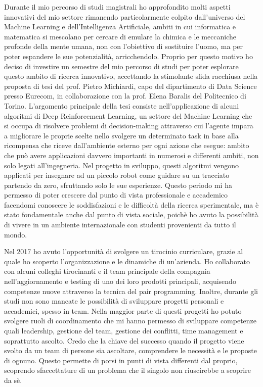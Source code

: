 \documentclass[11pt, a4paper]{awesome-cv}
\begin{document}
\begin{cvletter}
Durante il mio percorso di studi magistrali ho approfondito molti aspetti innovativi del mio settore rimanendo particolarmente colpito dall'universo del Machine Learning e dell'Intelligenza Artificiale, ambiti in cui informatica e matematica si mescolano per cercare di emulare la chimica e le meccaniche profonde della mente umana, non con l'obiettivo di sostituire l'uomo, ma per poter espandere le sue potenzialità, arricchendolo.
Proprio per questo motivo ho deciso di investire un semestre del mio percorso di studi per poter esplorare questo ambito di ricerca innovativo, accettando la stimolante sfida racchiusa nella proposta di tesi del prof. Pietro Michiardi, capo del dipartimento di Data Science presso Eurecom, in collaborazione con la prof. Elena Baralis del Politecnico di Torino.
L'argomento principale della tesi consiste nell'applicazione di alcuni algoritmi di Deep Reinforcement Learning, un settore del Machine Learning che si occupa di risolvere problemi di decision-making attraverso cui l'agente impara a migliorare le proprie scelte nello svolgere un determinato task in base alla ricompensa che riceve dall'ambiente esterno per ogni azione che esegue: ambito che può avere applicazioni davvero importanti in numerosi e differenti ambiti, non solo legati all'ingegneria. Nel progetto in sviluppo, questi algoritmi vengono applicati per insegnare ad un piccolo robot come guidare su un tracciato partendo da zero, sfruttando solo le sue esperienze.
Questo periodo mi ha permesso di poter crescere dal punto di vista professionale e accademico facendomi conoscere le soddisfazioni e le difficoltà della ricerca sperimentale, ma è stato fondamentale anche dal punto di vista sociale, poichè ho avuto la possibilità di vivere in un ambiente internazionale con studenti provenienti da tutto il mondo.

Nel 2017 ho avuto l'opportunità di svolgere un tirocinio curriculare, grazie al quale ho scoperto l'organizzazione e le dinamiche di un'azienda. Ho collaborato con alcuni colleghi tirocinanti e il team principale della compagnia nell'aggiornamento e testing di uno dei loro prodotti principali, acquisendo competenze nuove attraverso la tecnica del pair programming.
Inoltre, durante gli  studi non sono mancate le possibilità di sviluppare progetti personali e accademici, spesso in team. Nella maggior parte di questi progetti ho potuto svolgere ruoli di coordinamento che mi hanno permesso di sviluppare competenze quali leadership, gestione del team, gestione dei conflitti, time management e soprattutto ascolto. Credo che la chiave del successo quando il progetto viene svolto da un team di persone sia ascoltare, comprendere le necessità e le proposte di ognuno. Questo permette di porsi in punti di vista differenti dal proprio, scoprendo sfaccettature di un problema che il singolo non riuscirebbe a scoprire da sè.


\end{cvletter}
\end{document}
